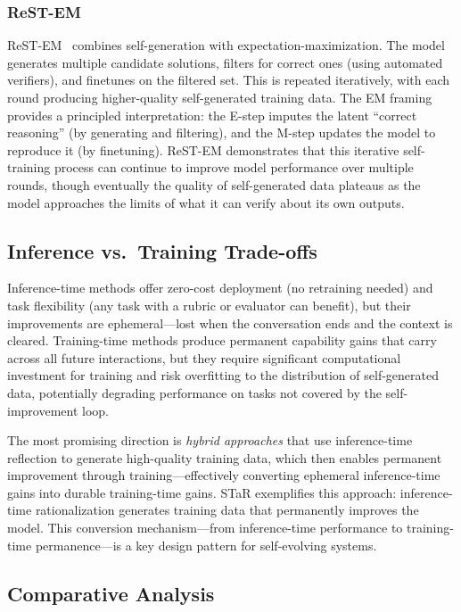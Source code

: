 \documentclass[11pt,a4paper]{article}
\begin{document}
\subsubsection{ReST-EM}

ReST-EM~\citep{gulrajani2023rest} combines self-generation with expectation-maximization. The model generates multiple candidate solutions, filters for correct ones (using automated verifiers), and finetunes on the filtered set. This is repeated iteratively, with each round producing higher-quality self-generated training data. The EM framing provides a principled interpretation: the E-step imputes the latent ``correct reasoning'' (by generating and filtering), and the M-step updates the model to reproduce it (by finetuning). ReST-EM demonstrates that this iterative self-training process can continue to improve model performance over multiple rounds, though eventually the quality of self-generated data plateaus as the model approaches the limits of what it can verify about its own outputs.

\subsection{Inference vs.\ Training Trade-offs}

Inference-time methods offer zero-cost deployment (no retraining needed) and task flexibility (any task with a rubric or evaluator can benefit), but their improvements are ephemeral---lost when the conversation ends and the context is cleared. Training-time methods produce permanent capability gains that carry across all future interactions, but they require significant computational investment for training and risk overfitting to the distribution of self-generated data, potentially degrading performance on tasks not covered by the self-improvement loop.

The most promising direction is \emph{hybrid approaches} that use inference-time reflection to generate high-quality training data, which then enables permanent improvement through training---effectively converting ephemeral inference-time gains into durable training-time gains. STaR exemplifies this approach: inference-time rationalization generates training data that permanently improves the model. This conversion mechanism---from inference-time performance to training-time permanence---is a key design pattern for self-evolving systems.

\subsection{Comparative Analysis}
\end{document}
